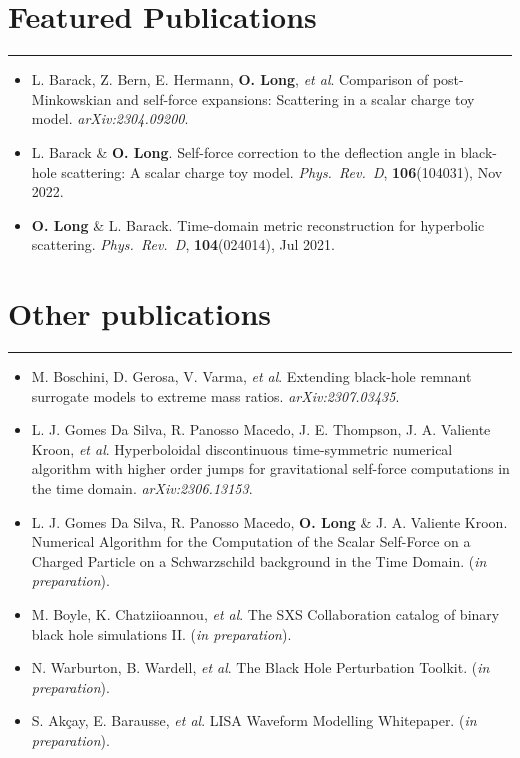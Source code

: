 \documentclass[10.5pt, oneside]{article}   	%
\begin{document}
{\color{Sectioncolour}
\section*{Featured Publications}
\vspace{-3mm}
\noindent\rule{\linewidth}{0.6pt}}
\begin{itemize}
\item L. Barack, Z. Bern, E. Hermann, {\bf O. Long}, {\it et al}. Comparison of post-Minkowskian and self-force expansions: Scattering in a scalar charge toy model. {\it arXiv:2304.09200}. \href{https://arxiv.org/abs/2304.09200}{}
\item L. Barack \& {\bf O. Long}. Self-force correction to the deflection angle in black-hole scattering: A scalar charge toy model. {\it Phys.\ Rev.\ D}, {\bf 106}(104031), Nov 2022. \href{https://journals.aps.org/prd/abstract/10.1103/PhysRevD.106.104031}{}
\item {\bf O. Long} \& L. Barack. Time-domain metric reconstruction for hyperbolic scattering. {\it Phys.\ Rev.\ D}, {\bf 104}(024014), Jul 2021. \href{https://journals.aps.org/prd/abstract/10.1103/PhysRevD.104.024014}
{}
\end{itemize} 

{\color{Sectioncolour} 
\section*{Other publications}
\vspace{-3mm}
\noindent\rule{\linewidth}{0.6pt}}
\begin{itemize}
\item M. Boschini, D. Gerosa, V. Varma, {\it et al}. Extending black-hole remnant surrogate models to extreme mass ratios. {\it arXiv:2307.03435}. \href{https://arxiv.org/abs/2307.03435}{}
\item L. J. Gomes Da Silva, R. Panosso Macedo, J. E. Thompson,  J. A. Valiente Kroon, {\it et al}. Hyperboloidal discontinuous time-symmetric numerical algorithm with higher order jumps for gravitational self-force computations in the time domain. {\it arXiv:2306.13153}. \href{https://arxiv.org/abs/2306.13153}{}
\item L. J. Gomes Da Silva, R. Panosso Macedo, {\bf O. Long} \& J. A. Valiente Kroon. Numerical Algorithm for the Computation of the Scalar Self-Force on a Charged Particle on a Schwarzschild background in the Time Domain. ({\it in preparation}).
\item M. Boyle, K. Chatziioannou, {\it et al}. The SXS Collaboration catalog of binary black hole simulations II. ({\it in preparation}).
\item N. Warburton, B. Wardell, {\it et al}. The Black Hole Perturbation Toolkit. ({\it in preparation}).
\item S. Akçay, E. Barausse, {\it et al}. LISA Waveform Modelling Whitepaper. ({\it in preparation}).
\end{itemize} 
\end{document}

